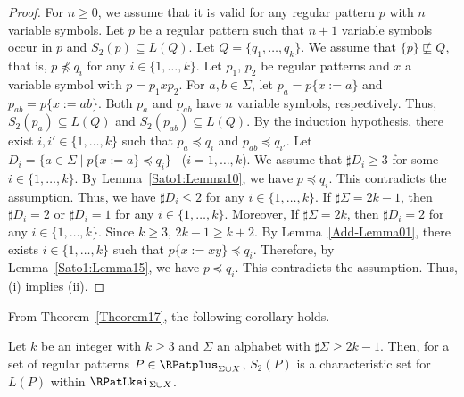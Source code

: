 \begin{proof}
    For $n \geq 0$,
    we assume that it is valid for any regular pattern $p$
    with $n$ variable symbols.
    Let $p$ be a regular pattern such that $n+1$ variable symbols occur in $p$
    and $S_{2}(p) \subseteq L(Q)$.
    {\color{black} Let $Q = \{q_{1},\ldots,q_{k}\}$.}
    We assume that {\color{black}$\{p\} \not\sqsubseteq Q$}, that is, {\color{black}$p \not\preceq q_{i}$}
    for any $i \in \{1,\ldots,k\}$.
    {\color{black} Let $p_{1}$, $p_{2}$ be regular patterns and $x$ a variable symbol with $p = p_{1}xp_{2}$.}
    For $a, b \in \Sigma$,
    let $p_{a}=p\{x:=a\}$ and $p_{ab}=p\{x:=ab\}$.
    Both $p_a$ and $p_{ab}$ have $n$ variable symbols, respectively. 
    Thus, $S_2(p_a) \subseteq L(Q)$ and $S_2(p_{ab}) \subseteq L(Q)$. 
    By the induction hypothesis, there exist $i, i' \in \{1, \ldots, k\}$ such that $p_a \preceq q_i$ and $p_{ab} \preceq q_{i'}$.
    Let $D_{i} = \{a \in \Sigma \mid p\{x:=a\} \preceq q_{i}\}$ \ ($i=1,\ldots,k$).
    We assume that $\sharp D_{i} \geq 3$ for some $i \in \{1,\ldots, k\}$.
    By Lemma~\ref{Sato1:Lemma10}, 
    we have $p \preceq q_{i}$.
    This contradicts the assumption.
    Thus, we have $\sharp D_{i} \leq 2$ for any $i \in \{1,\ldots,k\}$.
    If $\sharp\Sigma = 2k-1$, then
    $\sharp D_{i}=2$ or $\sharp D_{i}=1$ for any $i \in \{1,\ldots,k\}$.
    Moreover,
    If $\sharp\Sigma = 2k$, then
    $\sharp D_{i}=2$ for any $i \in \{1,\ldots,k\}$.
    Since $k \geq 3$, {\color{black} $2k-1 \geq k+2$}.
    By Lemma~\ref{Add-Lemma01},
    there exists $i \in \{1,\ldots,k\}$ such that $p\{x:=xy\} \preceq q_{i}$.
    Therefore, by Lemma~\ref{Sato1:Lemma15}, 
    we have $p \preceq q_{i}$.
    This contradicts the assumption.
    Thus, (i) implies (ii).
\end{proof}

From Theorem~\ref{Theorem17}, 
{\color{black}the following corollary holds}.


\begin{col}\label{Col18}
    {\color{black}Let $k$ be an integer with $k \geq 3$ and $\Sigma$ an alphabet with $\sharp\Sigma \geq 2k-1$.
    Then, for a set of regular patterns $P \in \RPatplus_{\Sigma\cup X}$,}
    $S_{2}(P)$ is a characteristic set for $L(P)$ within $\RPatLkei_{\Sigma\cup X}$.
\end{col}

